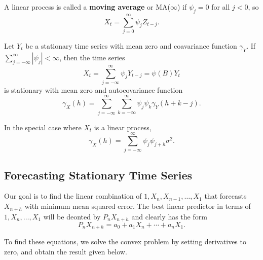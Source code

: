 A linear process is called a \textbf{moving average} or MA($\infty$)
if $\psi_{j} = 0$ for all $j < 0$, so
\begin{equation}
  \label{eq:9}
  X_{t} = \sum_{j=0}^{\infty} \psi_{j} Z_{t-j}.
\end{equation}

\begin{proposition}
  Let $Y_{t}$ be a stationary time series with mean zero and
  coavariance function $\gamma_{Y}$.  If $\sum_{j=-\infty}^{\infty}
  |\psi_{j}| < \infty$, then the time series
  \begin{equation}
    \label{eq:9}
    X_{t} = \sum_{j=-\infty}^{\infty} \psi_{j} Y_{t-j} = \psi(B) Y_{t}
  \end{equation}
  is stationary with mean zero and autocovariance function
  \begin{equation}
    \gamma_{X}(h) = \sum_{j=-\infty}^{\infty}
    \sum_{k=-\infty}^{\infty} \psi_{j}\psi_{k} \gamma_{Y}(h + k - j).
  \end{equation}

  In the special case where $X_{t}$ is a linear process,
  \begin{equation}
    \gamma_{X}(h) = \sum_{j=-\infty}^{\infty} \psi_{j} \psi_{j + h} \sigma^{2}.
  \end{equation}
\end{proposition}

\subsection{Forecasting Stationary Time Series}
\label{sec:forec-stat-time}

Our goal is to find the linear combination of $1, X_{n}, X_{n-1},
\dots, X_{1}$ that forecasts $X_{n+h}$ with minimum mean squared
error.  The best linear predictor in terms of $1, X_{n}, \dots, X_{1}$
will be deonted by $P_{n} X_{n+h}$ and clearly has the form
\begin{equation}
  P_{n}X_{n+h} = a_{0} + a_{1} X_{n} + \cdots + a_{n} X_{1}.
\end{equation}

To find these equations, we solve the convex problem by setting
derivatives to zero, and obtain the result given below.


